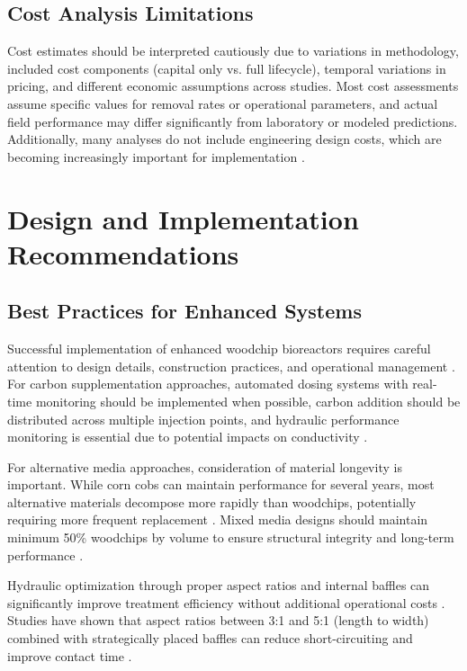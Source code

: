 \documentclass[12pt,a4paper]{article}
\begin{document}
\subsection{Cost Analysis Limitations}

Cost estimates should be interpreted cautiously due to variations in methodology, included cost components (capital only vs. full lifecycle), temporal variations in pricing, and different economic assumptions across studies. Most cost assessments assume specific values for removal rates or operational parameters, and actual field performance may differ significantly from laboratory or modeled predictions. Additionally, many analyses do not include engineering design costs, which are becoming increasingly important for implementation \citep{RN289}.

\section{Design and Implementation Recommendations}

\subsection{Best Practices for Enhanced Systems}

Successful implementation of enhanced woodchip bioreactors requires careful attention to design details, construction practices, and operational management \citep{RN310, RN312}. For carbon supplementation approaches, automated dosing systems with real-time monitoring should be implemented when possible, carbon addition should be distributed across multiple injection points, and hydraulic performance monitoring is essential due to potential impacts on conductivity \citep{RN632}.

For alternative media approaches, consideration of material longevity is important. While corn cobs can maintain performance for several years, most alternative materials decompose more rapidly than woodchips, potentially requiring more frequent replacement \citep{RN350, RN624}. Mixed media designs should maintain minimum 50\% woodchips by volume to ensure structural integrity and long-term performance \citep{RN350}.

Hydraulic optimization through proper aspect ratios and internal baffles can significantly improve treatment efficiency without additional operational costs \citep{RN309}. Studies have shown that aspect ratios between 3:1 and 5:1 (length to width) combined with strategically placed baffles can reduce short-circuiting and improve contact time \citep{RN309}.
\end{document}
